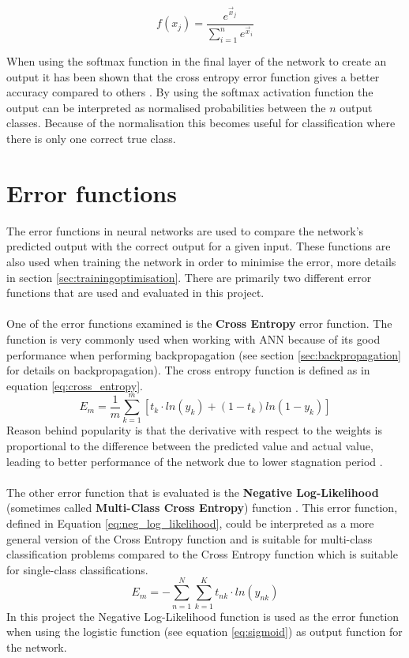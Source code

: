 \begin{equation} \label{eq:softmax}
    f(x_j) = \frac{e^{\vec{x}_j}}{\sum_{i=1}^{n} e^{\vec{x}_i}}
\end{equation}

When using the softmax function in the final layer of the network to create an output it has been shown that the cross entropy error function gives a better accuracy compared to others \parencite{dunne1997pairing,golik2013cross}. By using the softmax activation function the output can be interpreted as normalised probabilities between the $n$ output classes. Because of the normalisation this becomes useful for classification where there is only one correct true class.

\section{Error functions} \label{errorfunction}
The error functions in neural networks are used to compare the network's predicted output with the correct output for a given input. These functions are also used when training the network in order to minimise the error, more details in section \ref{sec:trainingoptimisation}. There are primarily two different error functions that are used and evaluated in this project.
\\\\
One of the error functions examined is the \textbf{Cross Entropy} error function. The function is very commonly used when working with ANN because of its good performance when performing backpropagation (see section \ref{sec:backpropagation} for details on backpropagation). The cross entropy function is defined as in equation \ref{eq:cross_entropy}.
\begin{equation} \label{eq:cross_entropy}
    E_m = \frac{1}{m}\sum_{k=1}^{m} [t_k \cdot ln(y_k) +(1-t_k)ln(1-y_k) ]
\end{equation}
Reason behind popularity is that the derivative with respect to the weights is proportional to the difference between the predicted value and actual value, leading to better performance of the network due to lower stagnation period \parencite{nasr2002cross}.
\\\\
The other error function that is evaluated is the \textbf{Negative Log-Likelihood} (sometimes called \textbf{Multi-Class Cross Entropy}) function \parencite{bishop2006pattern}. This error function, defined in Equation \ref{eq:neg_log_likelihood}, could be interpreted as a more general version of the Cross Entropy function and is suitable for multi-class classification problems compared to the Cross Entropy function which is suitable for single-class classifications.
\begin{equation} \label{eq:neg_log_likelihood}
    E_m = - \sum^N_{n=1}\sum^K_{k=1} t_{nk} \cdot ln (y_{nk})
\end{equation}
In this project the Negative Log-Likelihood function is used as the error function when using the logistic function (see equation \ref{eq:sigmoid}) as output function for the network.

